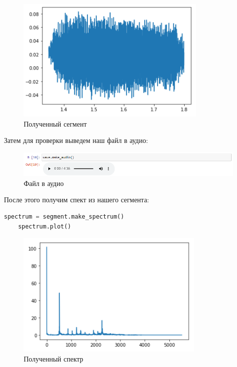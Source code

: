 \documentclass[a4paper]{article}
\begin{document}
             \begin{figure}[H]
                \centering
                \includegraphics{ex_4_segment.png}
                \caption{Полученный сегмент}
                \label{fig:ex_4_segment}
            \end{figure}
            
            Затем для проверки выведем наш файл в аудио:
            
            \begin{figure}[H]
                \centering
                \includegraphics[width=\textwidth]{ex_4_wave_audio.png}
                \caption{Файл в аудио}
                \label{fig:ex_4_wave_audio}
            \end{figure}
            
            После этого получим спект из нашего сегмента:
            
\begin{lstlisting}[language=Python, caption= Получение спектра из сегмента]
    spectrum = segment.make_spectrum()
    spectrum.plot()
\end{lstlisting}   
            
             \begin{figure}[H]
                \centering
                \includegraphics{ex_4_wave_spectr.png}
                \caption{Полученный спектр}
                \label{fig:ex_4_wave_spectr}
            \end{figure}
            
\end{document}
